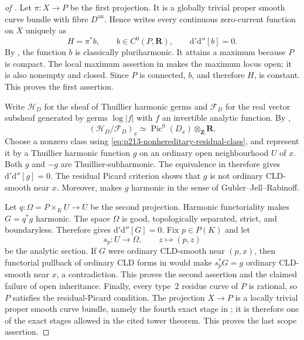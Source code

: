 \begin{proof}[of
]
Let $\pi:X\to P$ be the first projection.  It is a globally trivial
proper smooth curve bundle with fibre $D^{\mathrm{an}}$.  Hence
 writes every continuous
zero-current function on $X$ uniquely as
\[
                              H=\pi^*b,
 \qquad b\in C^0(P,\mathbf R),
 \qquad \mathrm d'\mathrm d''[b]=0.
\]
By , the function $b$ is
classically pluriharmonic.  It attains a maximum because $P$ is compact.
The local maximum assertion in  makes the
maximum locus open; it is also nonempty and closed.  Since $P$ is connected,
$b$, and therefore $H$, is constant.  This proves the first assertion.

Write $\mathcal H_D$ for the sheaf of Thuillier harmonic germs and
$\mathcal F_D$ for the real vector subsheaf generated by germs $\log|f|$
with $f$ an invertible analytic function.  By
,
\[
       (\mathcal H_D/\mathcal F_D)_x
       \simeq\operatorname{Pic}^0(D_x)\otimes_{\mathbf Z}\mathbf R.
\]
Choose a nonzero class using
\eqref{eq:p213-nonhereditary-residual-class}, and represent it by a
Thuillier harmonic function $g$ on an ordinary open neighbourhood $U$ of
$x$.  Both $g$ and $-g$ are Thuillier-subharmonic.  The equivalence in
 therefore gives
$\mathrm d'\mathrm d''[g]=0$.  The residual Picard criterion
 shows that $g$ is not
ordinary CLD-smooth near $x$.  Moreover,
 makes $g$ harmonic in the
sense of Gubler--Jell--Rabinoff.

Let $q:\Omega=P\times_KU\to U$ be the second projection.  Harmonic
functoriality  makes
$G=q^*g$ harmonic.  The space $\Omega$ is good, topologically separated,
strict, and boundaryless.  Therefore
\cite[Corollary~7.15]{GJR26} gives
$\mathrm d'\mathrm d''[G]=0$.  Fix $p\in P(K)$ and let
\[
                         s_p:U\longrightarrow\Omega,
 \qquad z\longmapsto(p,z)
\]
be the analytic section.  If $G$ were ordinary CLD-smooth near $(p,x)$,
then functorial pullback of ordinary CLD forms in
 would make
$s_p^*G=g$ ordinary CLD-smooth near $x$, a contradiction.  This proves the
second assertion and the claimed failure of open inheritance.  Finally,
every type~$2$ residue curve of $P$ is rational, so $P$ satisfies the
residual-Picard condition.  The projection $X\to P$ is a locally trivial
proper smooth curve bundle, namely the fourth exact stage in
; it is therefore one of
the exact stages allowed in the cited tower theorem.  This proves the last
scope assertion.
\end{proof}


